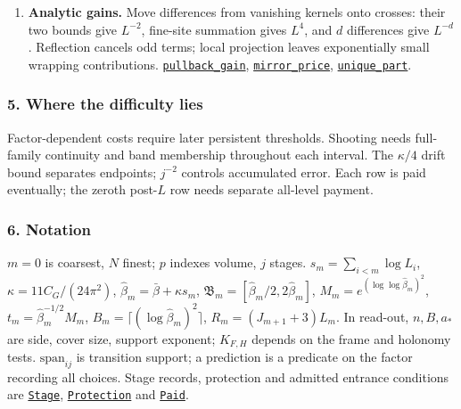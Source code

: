 \documentclass[
  letterpaper,
  11pt]{article}
\begin{document}
\begin{enumerate}
  \href{https://github.com/yang-mills-group/OpenAI-YM-20261028/blob/3456e5e75cf8d4cd558955a5c7638fba2d68f464/YM/Integration/RG05Preconstruction/PeriodConstruction.lean\#L30-L47}{\texttt{engageWithCustodyFactor}}.
\item
  \textbf{Analytic gains.} Move differences from vanishing kernels onto
  crosses: their two bounds give \(L^{-2}\), fine-site summation gives
  \(L^4\), and \(d\) differences give \(L^{-d}\). Reflection cancels odd
  terms; local projection leaves exponentially small wrapping
  contributions.
  \href{https://github.com/yang-mills-group/OpenAI-YM-20261028/blob/3456e5e75cf8d4cd558955a5c7638fba2d68f464/YM/RG08/Flat/Pullback.lean\#L56-L110}{\texttt{pullback\_gain}},
  \href{https://github.com/yang-mills-group/OpenAI-YM-20261028/blob/3456e5e75cf8d4cd558955a5c7638fba2d68f464/YM/RG12/Shadows/Shape.lean\#L54-L70}{\texttt{mirror\_price}},
  \href{https://github.com/yang-mills-group/OpenAI-YM-20261028/blob/3456e5e75cf8d4cd558955a5c7638fba2d68f464/YM/TraceExtension/Quince/Unum.lean\#L11-L42}{\texttt{unique\_part}}.
\end{enumerate}

\subsubsection{5. Where the difficulty
lies}\label{where-the-difficulty-lies-4}

Factor-dependent costs require later persistent thresholds. Shooting
needs full-family continuity and band membership throughout each
interval. The \(\kappa/4\) drift bound separates endpoints; \(j^{-2}\)
controls accumulated error. Each row is paid eventually; the zeroth
post-\(L\) row needs separate all-level payment.

\subsubsection{6. Notation}\label{notation-4}

\(m=0\) is coarsest, \(N\) finest; \(p\) indexes volume, \(j\) stages.
\(s_m=\sum_{i<m}\log L_i\), \(\kappa=11C_G/(24\pi^2)\),
\(\hat\beta_m=\bar\beta+\kappa s_m\),
\(\mathfrak B_m=[\hat\beta_m/2,2\hat\beta_m]\),
\(M_m=e^{(\log\log\hat\beta_m)^2}\), \(t_m=\hat\beta_m^{-1/2}M_m\),
\(B_m=\lceil(\log\hat\beta_m)^2\rceil\), \(R_m=(J_{m+1}+3)L_m\). In
read-out, \(n,B,a_*\) are side, cover size, support exponent;
\(K_{F,H}\) depends on the frame and holonomy tests.
\(\mathrm{span}_{ij}\) is transition support; a prediction is a
predicate on the factor recording all choices. Stage records, protection
and admitted entrance conditions are
\href{https://github.com/yang-mills-group/OpenAI-YM-20261028/blob/3456e5e75cf8d4cd558955a5c7638fba2d68f464/YM/RG/History.lean\#L45-L61}{\texttt{Stage}},
\href{https://github.com/yang-mills-group/OpenAI-YM-20261028/blob/3456e5e75cf8d4cd558955a5c7638fba2d68f464/YM/Price/Intent.lean\#L88-L92}{\texttt{Protection}}
and
\href{https://github.com/yang-mills-group/OpenAI-YM-20261028/blob/3456e5e75cf8d4cd558955a5c7638fba2d68f464/YM/Price/Intent.lean\#L145-L162}{\texttt{Paid}}.
\end{document}
